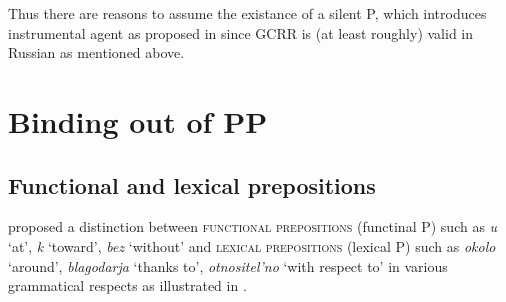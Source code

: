 \documentclass[output=paper,
]{langscibook}
\begin{document}
\noindent
Thus there are reasons to assume the existance of a silent P, which introduces instrumental agent as proposed in  since GCRR is (at least roughly) valid in Russian as mentioned above. 


\section{Binding out of PP}\label{sec:PP}

\subsection{Functional and lexical prepositions}

\citet{YadroffFranks2001} proposed a distinction between \textsc{functional prepositions} (functinal P) such as \textit{u} `at', \textit{k} `toward',  \textit{bez} `without' and \textsc{lexical prepositions} (lexical P) such as \textit{okolo} `around', \textit{blagodarja} `thanks to', \textit{otnositel'no} `with respect to' in various grammatical respects as illustrated in  . 
\end{document}
